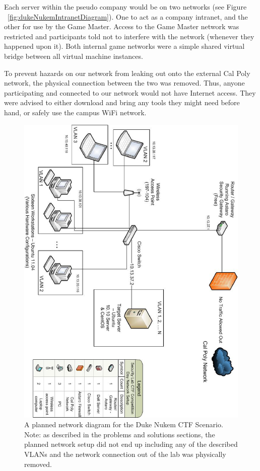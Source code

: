 \documentclass[10pt]{article}
\begin{document}
Each server within the pseudo company would be on two networks (see Figure
~\ref{fig:dukeNukemIntranetDiagram}). One to act as a company intranet, and the
other for use by the Game Master. Access to the Game Master network was
restricted and participants told not to interfere with the network (whenever
they happened upon it). Both internal game networks were a simple shared virtual
bridge between all virtual machine instances.

To prevent hazards on our network from leaking out onto the external Cal Poly
network, the physical connection between the two was removed. Thus, anyone
participating and connected to our network would not have Internet access. They
were advised to either download and bring any tools they might need before hand,
or safely use the campus WiFi network.

\begin{figure}[here]
\includegraphics[scale=.50]{resources/dukenukem_network_diagram.eps}
\caption{A planned network diagram for the Duke Nukem CTF Scenario. Note: as
described in the problems and solutions sections, the planned network setup
did not end up including any of the described VLANs and the network connection
out of the lab was physically removed.}
\label{fig:dukeNetworkDiagram}
\end{figure}
\end{document}
